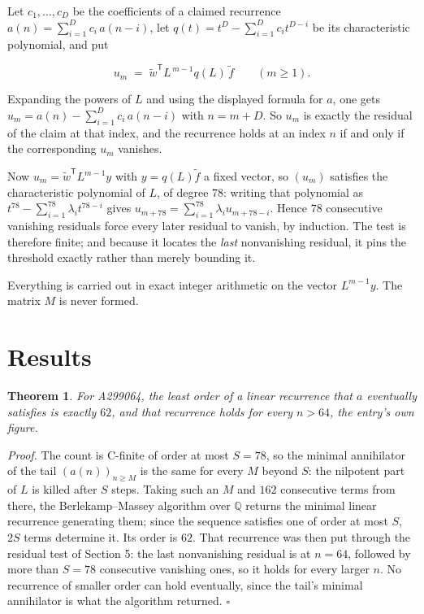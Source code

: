 \documentclass[11pt]{article}
\newtheorem{theorem}{Theorem}
\theoremstyle{definition}
\begin{document}
Let $c_1,\dots,c_D$ be the coefficients of a claimed recurrence $a(n) = \sum_{i=1}^{D} c_i\,a(n-i)$, let $q(t) = t^{D} - \sum_{i=1}^{D} c_i t^{D-i}$ be its characteristic polynomial, and put

\[u_m \;=\; \tilde w^{\mathsf T} L^{\,m-1} q(L)\,\tilde f \qquad (m \ge 1).\]

Expanding the powers of $L$ and using the displayed formula for $a$, one gets $u_m = a(n) - \sum_{i=1}^{D} c_i\,a(n-i)$ with $n = m + D$. So $u_m$ is exactly the residual of the claim at that index, and the recurrence holds at an index $n$ if and only if the corresponding $u_m$ vanishes.

Now $u_m = \tilde w^{\mathsf T} L^{m-1} y$ with $y = q(L)\tilde f$ a fixed vector, so $(u_m)$ satisfies the characteristic polynomial of $L$, of degree $78$: writing that polynomial as $t^{78} - \sum_{i=1}^{78} \lambda_i t^{78-i}$ gives $u_{m+78} = \sum_{i=1}^{78} \lambda_i u_{m+78-i}$. Hence $78$ consecutive vanishing residuals force every later residual to vanish, by induction. The test is therefore finite; and because it locates the {\itshape last} nonvanishing residual, it pins the threshold exactly rather than merely bounding it.

Everything is carried out in exact integer arithmetic on the vector $L^{m-1}y$. The matrix $M$ is never formed.

\section{Results}

\begin{theorem} For A299064, the least order of a linear recurrence that $a$ eventually satisfies is exactly $62$, and that recurrence holds for every $n > 64$, the entry's own figure.\end{theorem}

{\itshape Proof.} The count is C-finite of order at most $S = 78$, so the minimal annihilator of the tail $(a(n))_{n \ge M}$ is the same for every $M$ beyond $S$: the nilpotent part of $L$ is killed after $S$ steps. Taking such an $M$ and $162$ consecutive terms from there, the Berlekamp--Massey algorithm over $\mathbb{Q}$ returns the minimal linear recurrence generating them; since the sequence satisfies one of order at most $S$, $2S$ terms determine it. Its order is $62$. That recurrence was then put through the residual test of Section 5: the last nonvanishing residual is at $n = 64$, followed by more than $S = 78$ consecutive vanishing ones, so it holds for every larger $n$. No recurrence of smaller order can hold eventually, since the tail's minimal annihilator is what the algorithm returned. $\square$
\end{document}
